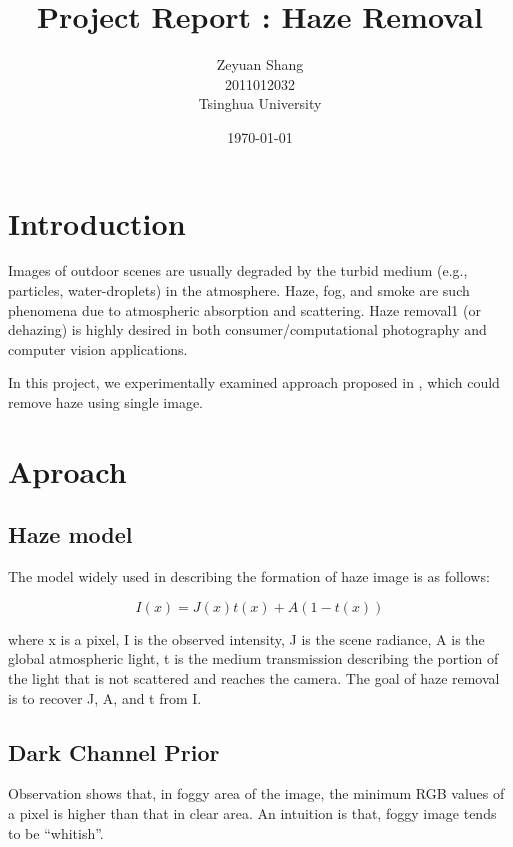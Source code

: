 \documentclass{article}
\begin{document}
\setlength{\parindent}{2em}
\linespread{1}

\title{Project Report : Haze Removal}
\author{Zeyuan Shang \\ 2011012032 \\ Tsinghua University}
\date{\today}
\maketitle

\section{Introduction}
    
    Images of outdoor scenes are usually degraded by the turbid medium (e.g., particles, water-droplets) in the atmosphere. Haze, fog, and smoke are such phenomena due to atmospheric absorption and scattering. Haze removal1 (or dehazing) is highly desired in both consumer/computational photography and computer vision applications.

    In this project, we experimentally examined approach proposed in \cite{Kaiming}, which could remove haze using single image.

\section{Aproach}

    \subsection{Haze model}

        The model widely used in describing the formation of haze image is as follows:
        
        $$I(x) = J(x)t(x) + A(1 - t(x))$$

        where x is a pixel, I is the observed intensity, J is the scene radiance, A is the global atmospheric light, t is the medium transmission describing the portion of the light that is not scattered and reaches the camera. The goal of haze removal is to recover J, A, and t from I.

    \subsection{Dark Channel Prior}

        Observation shows that, in foggy area of the image, the minimum RGB values of a pixel is higher than that in clear area. An intuition is that, foggy image tends to be “whitish”.
\end{document}
